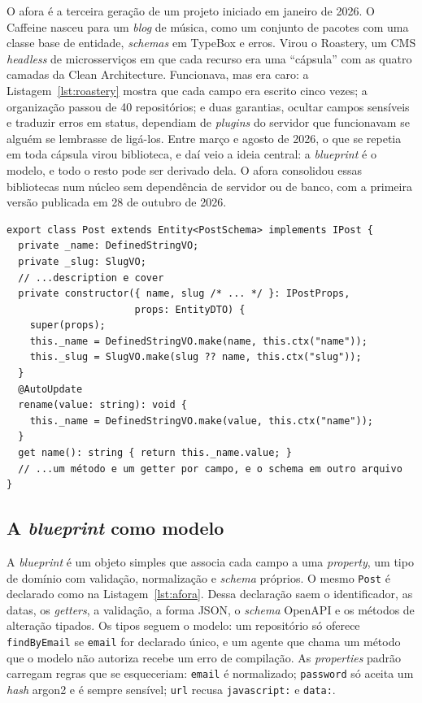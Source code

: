 \documentclass[a4paper,12pt]{article}
\newcommand{\estr}[1]{\textit{#1}}
\begin{document}
O afora é a terceira geração de um projeto iniciado em janeiro de 2026. O Caffeine nasceu para um \estr{blog} de música, como um conjunto de pacotes com uma classe base de entidade, \estr{schemas} em TypeBox e erros. Virou o Roastery, um CMS \estr{headless} de microsserviços em que cada recurso era uma ``cápsula'' com as quatro camadas da Clean Architecture. Funcionava, mas era caro: a Listagem~\ref{lst:roastery} mostra que cada campo era escrito cinco vezes; a organização passou de 40 repositórios; e duas garantias, ocultar campos sensíveis e traduzir erros em status, dependiam de \estr{plugins} do servidor que funcionavam se alguém se lembrasse de ligá-los. Entre março e agosto de 2026, o que se repetia em toda cápsula virou biblioteca, e daí veio a ideia central: a \estr{blueprint} é o modelo, e todo o resto pode ser derivado dela. O afora consolidou essas bibliotecas num núcleo sem dependência de servidor ou de banco, com a primeira versão publicada em 28 de outubro de 2026.

\begin{lstlisting}[float=htbp,caption={Entidade \texttt{Post} do Roastery (trecho simplificado).},label={lst:roastery}]
export class Post extends Entity<PostSchema> implements IPost {
  private _name: DefinedStringVO;
  private _slug: SlugVO;
  // ...description e cover
  private constructor({ name, slug /* ... */ }: IPostProps,
                      props: EntityDTO) {
    super(props);
    this._name = DefinedStringVO.make(name, this.ctx("name"));
    this._slug = SlugVO.make(slug ?? name, this.ctx("slug"));
  }
  @AutoUpdate
  rename(value: string): void {
    this._name = DefinedStringVO.make(value, this.ctx("name"));
  }
  get name(): string { return this._name.value; }
  // ...um método e um getter por campo, e o schema em outro arquivo
}
\end{lstlisting}

\subsection{A \textit{blueprint} como modelo}

A \estr{blueprint} é um objeto simples que associa cada campo a uma \estr{property}, um tipo de domínio com validação, normalização e \estr{schema} próprios. O mesmo \texttt{Post} é declarado como na Listagem~\ref{lst:afora}. Dessa declaração saem o identificador, as datas, os \estr{getters}, a validação, a forma JSON, o \estr{schema} OpenAPI e os métodos de alteração tipados. Os tipos seguem o modelo: um repositório só oferece \texttt{findByEmail} se \texttt{email} for declarado único, e um agente que chama um método que o modelo não autoriza recebe um erro de compilação. As \estr{properties} padrão carregam regras que se esqueceriam: \texttt{email} é normalizado; \texttt{password} só aceita um \estr{hash} argon2 e é sempre sensível; \texttt{url} recusa \texttt{javascript:} e \texttt{data:}.
\end{document}

